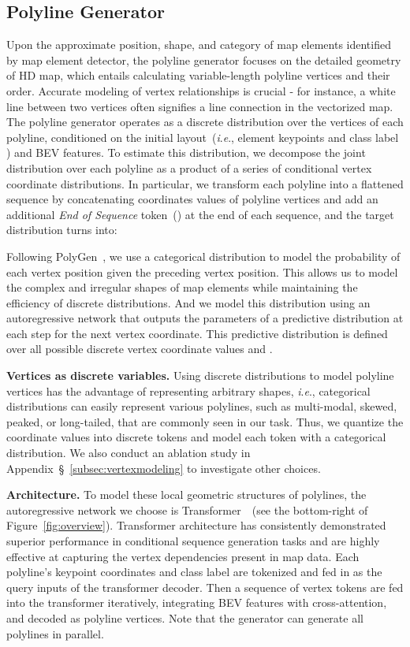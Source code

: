 \documentclass{article}
\newcommand{\ie}{\textit{i}.\textit{e}., }
\theoremstyle{plain}
\theoremstyle{definition}
\theoremstyle{remark}
\begin{document}
\subsection{Polyline Generator}
\label{sec:gen}
Upon the approximate position, shape, and category of map elements identified by map element detector, the polyline generator focuses on the detailed geometry of HD map, which entails calculating variable-length polyline vertices and their order. Accurate modeling of vertex relationships is crucial - for instance, a white line between two vertices often signifies a line connection in the vectorized map.
The polyline generator operates as a discrete distribution  over the vertices of each polyline, conditioned on the initial layout~(\ie element keypoints  and class label ) and BEV features. To estimate this distribution, we decompose the joint distribution over each polyline   as a product of a series of conditional vertex coordinate distributions. 
In particular, we transform each polyline  into a flattened sequence  by concatenating coordinates values of polyline vertices and add an additional \textit{End of Sequence} token~() at the end of each sequence, and the target distribution turns into:

Following PolyGen~\cite{nash2020polygen}, we use a categorical distribution to model the probability of each vertex position given the preceding vertex position. This allows us to model the complex and irregular shapes of map elements while maintaining the efficiency of discrete distributions. And we model this distribution using an autoregressive network that outputs the parameters of a predictive distribution at each step for the next vertex coordinate. This predictive distribution is defined over all possible discrete vertex coordinate values and . 

\noindent\textbf{Vertices as discrete variables.} 
Using discrete distributions to model polyline vertices has the advantage of representing arbitrary shapes, \ie categorical distributions can easily represent various polylines, such as multi-modal, skewed, peaked, or long-tailed, that are commonly seen in our task. 
Thus, we quantize the coordinate values into discrete tokens and model each token with a categorical distribution.
We also conduct an ablation study in Appendix~\S~\ref{subsec:vertexmodeling} to investigate other choices.

\noindent\textbf{Architecture.}
To model these local geometric structures of polylines, the autoregressive network we choose is Transformer~\citep{vaswani2017attention}~(see the bottom-right of Figure~\ref{fig:overview}). Transformer architecture has consistently demonstrated superior performance in conditional sequence generation tasks and are highly effective at capturing the vertex dependencies present in map data. Each polyline's keypoint coordinates and class label are tokenized and fed in as the query inputs of the transformer decoder. Then a sequence of vertex tokens are fed into the transformer iteratively, integrating BEV features with cross-attention, and decoded as polyline vertices. Note that the generator can generate all polylines in parallel. 
\end{document}
